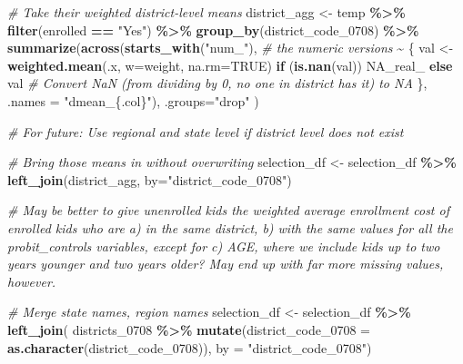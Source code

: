 \documentclass[
]{article}
\newenvironment{Shaded}{\begin{snugshade}}{\end{snugshade}}
\newcommand{\AttributeTok}[1]{\textcolor[rgb]{0.13,0.29,0.53}{#1}}
\newcommand{\CommentTok}[1]{\textcolor[rgb]{0.56,0.35,0.01}{\textit{#1}}}
\newcommand{\ConstantTok}[1]{\textcolor[rgb]{0.56,0.35,0.01}{#1}}
\newcommand{\ControlFlowTok}[1]{\textcolor[rgb]{0.13,0.29,0.53}{\textbf{#1}}}
\newcommand{\FunctionTok}[1]{\textcolor[rgb]{0.13,0.29,0.53}{\textbf{#1}}}
\newcommand{\NormalTok}[1]{#1}
\newcommand{\OtherTok}[1]{\textcolor[rgb]{0.56,0.35,0.01}{#1}}
\newcommand{\SpecialCharTok}[1]{\textcolor[rgb]{0.81,0.36,0.00}{\textbf{#1}}}
\newcommand{\StringTok}[1]{\textcolor[rgb]{0.31,0.60,0.02}{#1}}
\begin{document}
\begin{Shaded}
\begin{Highlighting}[]
\CommentTok{\# Take their weighted district{-}level means}
\NormalTok{district\_agg }\OtherTok{\textless{}{-}}\NormalTok{ temp }\SpecialCharTok{\%\textgreater{}\%}
  \FunctionTok{filter}\NormalTok{(enrolled }\SpecialCharTok{==} \StringTok{"Yes"}\NormalTok{) }\SpecialCharTok{\%\textgreater{}\%} 
  \FunctionTok{group\_by}\NormalTok{(district\_code\_0708) }\SpecialCharTok{\%\textgreater{}\%}
  \FunctionTok{summarize}\NormalTok{(}\FunctionTok{across}\NormalTok{(}\FunctionTok{starts\_with}\NormalTok{(}\StringTok{"num\_"}\NormalTok{), }\CommentTok{\# the numeric versions}
                   \SpecialCharTok{\textasciitilde{}}\NormalTok{ \{}
\NormalTok{                     val }\OtherTok{\textless{}{-}} \FunctionTok{weighted.mean}\NormalTok{(.x, }\AttributeTok{w=}\NormalTok{weight, }\AttributeTok{na.rm=}\ConstantTok{TRUE}\NormalTok{) }
                     \ControlFlowTok{if}\NormalTok{ (}\FunctionTok{is.nan}\NormalTok{(val)) }\ConstantTok{NA\_real\_} \ControlFlowTok{else}\NormalTok{ val }\CommentTok{\# Convert NaN (from dividing by 0, no one in district has it) to NA}
\NormalTok{                   \},}
                   \AttributeTok{.names =} \StringTok{"dmean\_\{.col\}"}\NormalTok{),}
            \AttributeTok{.groups=}\StringTok{"drop"}
\NormalTok{            )}

\CommentTok{\# For future: Use regional and state level if district level does not exist}

\CommentTok{\# Bring those means in without overwriting}
\NormalTok{selection\_df }\OtherTok{\textless{}{-}}\NormalTok{ selection\_df }\SpecialCharTok{\%\textgreater{}\%}
  \FunctionTok{left\_join}\NormalTok{(district\_agg, }\AttributeTok{by=}\StringTok{"district\_code\_0708"}\NormalTok{)}

\CommentTok{\# May be better to give unenrolled kids the weighted average enrollment cost of enrolled kids who are a) in the same district, b) with the same values for all the probit\_controls variables, except for c) AGE, where we include kids up to two years younger and two years older? May end up with far more missing values, however.}


\CommentTok{\# Merge state names, region names}
\NormalTok{selection\_df }\OtherTok{\textless{}{-}}\NormalTok{ selection\_df }\SpecialCharTok{\%\textgreater{}\%} \FunctionTok{left\_join}\NormalTok{(}
\NormalTok{  districts\_0708 }\SpecialCharTok{\%\textgreater{}\%} \FunctionTok{mutate}\NormalTok{(}\AttributeTok{district\_code\_0708 =} \FunctionTok{as.character}\NormalTok{(district\_code\_0708)), }
  \AttributeTok{by =} \StringTok{"district\_code\_0708"}\NormalTok{)}



\end{Highlighting}
\end{Shaded}
\end{document}
